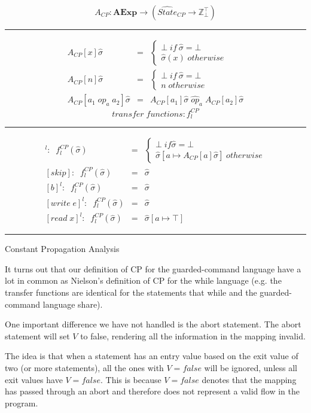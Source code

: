 \begin{table}
\[ A_{CP} : \textbf{AExp} \rightarrow (\hat{State}_{CP} \rightarrow \mathbb{Z}^{\top}_\bot) \]
\hrule
\begin{eqnarray}
A_{CP}[x]\hat{\sigma} &=& \begin{cases}
\bot \; if \: \hat{\sigma} = \bot \\
\hat{\sigma}(x) \; otherwise
\end{cases} \\
A_{CP}[n]\hat{\sigma} &=& \begin{cases}
\bot \; if \: \hat{\sigma} = \bot \\
n \; otherwise
\end{cases}\\
A_{CP}[a_1 \; op_a \; a_2]\hat{\sigma} &=& A_{CP}[a_1]\hat{\sigma} \; \hat{op}_a \; A_{CP}[a_2]\hat{\sigma}
\end{eqnarray}
\[ transfer \; functions: f^{CP}_{l} \]
\hrule
\begin{eqnarray}
[x := a]^l : \; \; f^{CP}_l(\hat{\sigma}) &=& \begin{cases}
\bot \; if \hat{\sigma} = \bot \\
\hat{\sigma}[a \mapsto A_{CP}[a]\hat{\sigma}] \; otherwise
\end{cases}\\
\left[skip\right] : \; \; f^{CP}_l(\hat{\sigma}) &=& \hat{\sigma} \\
\left[b\right]^{l} : \; \; f^{CP}_l(\hat{\sigma}) &=& \hat{\sigma}\\
\left[write \; e\right]^{l} : \; \; f^{CP}_l(\hat{\sigma}) &=& \hat{\sigma}\\
\left[read \; x\right]^{l} : \; \; f^{CP}_l(\hat{\sigma}) &=& \hat{\sigma}[a \mapsto \top] \;
\end{eqnarray}
\hrule
\caption{Constant Propagation Analysis}
\end{table}

\docpar
It turns out that our definition of CP for the guarded-command language
have a lot in common as Nielson's definition of CP for the while language
(e.g. the transfer functions are identical for the statements that while
and the guarded-command language share).

  One important difference we have not handled is the abort statement.
The abort statement will set $V$ to false, rendering all the information
in the mapping invalid.

  The idea is that when a statement has an entry value based on the exit
value of two (or more statements), all the ones with $V = false$ will be
ignored, unless all exit values have $V = false$. This is because $V = false$
denotes that the mapping has passed through an abort and therefore does
not represent a valid flow in the program.

